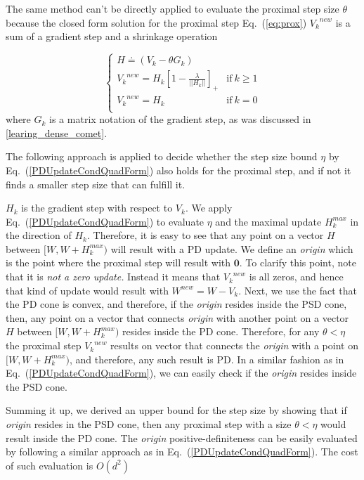\documentclass[twoside,11pt]{article}
\newcommand\mat[1]{{#1}}
\renewcommand\vec[1]{\mathbf{#1}}
\newcommand{\W}{\mat{W}}
\newcommand{\newW}{{\mat{W^{new}}}}
\newcommand{\eqdef}{\doteq}
\newcommand{\Hk}{H_k}
\newcommand{\Vk}{\mat{V_k}}
\renewcommand{\eqref}[1]{Eq.~(\ref{#1})}
\begin{document}
The same method can't be directly applied to evaluate the proximal step size $\theta$ because the closed form solution for the proximal step \eqref{eq:prox} $\Vk^{new}$ is a sum of a gradient step and a shrinkage operation

\begin{equation*}
 \begin{cases}
   H \eqdef (V_k-\theta G_k) \\ 
   \Vk^{new} = \Hk [1 - \frac{\lambda}{||\Hk||}]_+ & \text{if}\  k \geq 1\\
   \Vk^{new} = \Hk & \text{if}\ k = 0 \\ 
 \end{cases}
\end{equation*}
where $G_k$ is a matrix notation of the gradient step, as was discussed in \ref{learing_dense_comet}. 

The following approach is applied to decide whether the step size bound $\eta$ by \eqref{PDUpdateCondQuadForm} also holds for the proximal step, and if not it finds a smaller step size that can fulfill it.


\newcommand{\Vkorigin}{\emph{origin }}
$\Hk$ is the gradient step with respect to $\Vk$. We apply \eqref{PDUpdateCondQuadForm} to evaluate $\eta$ and the maximal update $\Hk^{max}$ in the direction of $\Hk$. Therefore, it is easy to see that any point on a vector $H$ between $[\W, \W + \Hk^{max})$ will result with a PD update. We define an \Vkorigin which is the point where the proximal step will result with $\vec{0}$. To clarify this point, note that it is \emph{not a zero update.} Instead it means that $\Vk^{new}$ is all zeros, and hence that kind of update would result with $\newW = \W - \Vk$. Next, we use the fact that the PD cone is convex, and therefore, if the \Vkorigin resides inside the PSD cone, then, any point on a vector that connects \Vkorigin with another point on a vector $H$ between $[\W, \W + \Hk^{max})$ resides inside the PD cone. Therefore, for any $\theta < \eta$ the proximal step $\Vk^{new}$ results on vector that connects the \Vkorigin with a point on $[\W, \W + \Hk^{max})$, and therefore, any such result is PD. In a similar fashion as in \eqref{PDUpdateCondQuadForm}, we can easily check if the \Vkorigin resides inside the PSD cone.  

Summing it up, we derived an upper bound for the step size by showing that if \Vkorigin resides in the PSD cone, then any proximal step with a size $\theta < \eta$ would result inside the PD cone. The \Vkorigin positive-definiteness can be easily evaluated by following a similar approach as in \eqref{PDUpdateCondQuadForm}. The cost of such evaluation is $O(d^2)$
\end{document}

